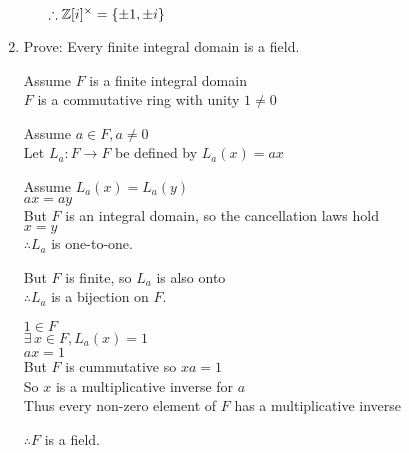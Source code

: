 \documentclass[letterpaper,12pt,fleqn]{article}
\begin{document}
\begin{enumerate}
\begin{enumerate}

      $\therefore\mathbb{Z}[i]^{\times}=\{\pm1,\pm i\}$
  \end{enumerate}

\item Prove: Every finite integral domain is a field.

  Assume $F$ is a finite integral domain \\
  $F$ is a commutative ring with unity $1\ne0$

  Assume $a\in F,a\ne0$ \\
  Let $L_a:F\to F$ be defined by $L_a(x)=ax$

  Assume $L_a(x)=L_a(y)$ \\
  $ax=ay$ \\
  But $F$ is an integral domain, so the cancellation laws hold \\
  $x=y$ \\
  $\therefore L_a$ is one-to-one.

  But $F$ is finite, so $L_a$ is also onto \\
  $\therefore L_a$ is a bijection on $F$.

  $1\in F$ \\
  $\exists\,x\in F,L_a(x)=1$ \\
  $ax=1$ \\
  But $F$ is cummutative so $xa=1$ \\
  So $x$ is a multiplicative inverse for $a$ \\
  Thus every non-zero element of $F$ has a multiplicative inverse

  $\therefore F$ is a field.
\end{enumerate}
\end{document}
